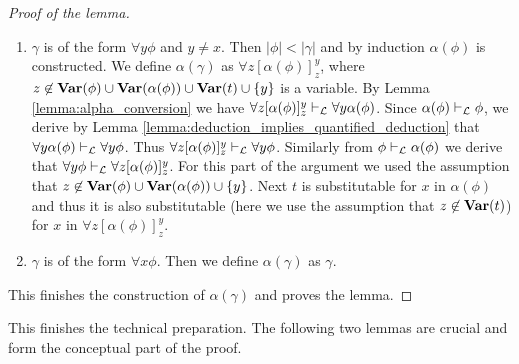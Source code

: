 \begin{proof}[Proof of the lemma]
\begin{enumerate}[label=\textbf{(\arabic*)}, leftmargin=3.0em]
\item $\gamma$ is of the form $\forall y\phi$ and $y \neq x$. Then $|\phi| < |\gamma|$ and by induction $\alpha(\phi)$ is constructed. We define $\alpha(\gamma)$ as $\forall z[\alpha(\phi)]^y_z$, where $z \not \in \mathbf{Var}(\phi) \cup \mathbf{Var}(\alpha(\phi)) \cup \mathbf{Var}(t) \cup \{y\}$ is a variable. By Lemma \ref{lemma:alpha_conversion} we have $\forall z[\alpha(\phi)]^y_z \vdash_{{\mathcal L}} \forall y \alpha(\phi)$. Since $\alpha(\phi) \vdash_{{\mathcal L}} \phi$, we derive by Lemma \ref{lemma:deduction_implies_quantified_deduction} that $\forall y \alpha(\phi) \vdash_{{\mathcal L}} \forall y\phi$. Thus $\forall z[\alpha(\phi)]^y_z \vdash_{{\mathcal L}} \forall y\phi$. Similarly from $\phi \vdash_{{\mathcal L}} \alpha(\phi)$ we derive that $\forall y\phi \vdash_{{\mathcal L}} \forall z[\alpha(\phi)]^y_z$. For this part of the argument we used the assumption that $z \not \in \mathbf{Var}(\phi) \cup \mathbf{Var}(\alpha(\phi)) \cup \{y\}$. Next $t$ is substitutable for $x$ in $\alpha(\phi)$ and thus it is also substitutable (here we use the assumption that $z \not \in \mathbf{Var}(t)$) for $x$ in $\forall z[\alpha(\phi)]^y_z$.
\item $\gamma$ is of the form $\forall x\phi$. Then we define $\alpha(\gamma)$ as $\gamma$.
\end{enumerate}
This finishes the construction of $\alpha(\gamma)$ and proves the lemma.
\end{proof}
\noindent
This finishes the technical preparation. The following two lemmas are crucial and form the conceptual part of the proof.

